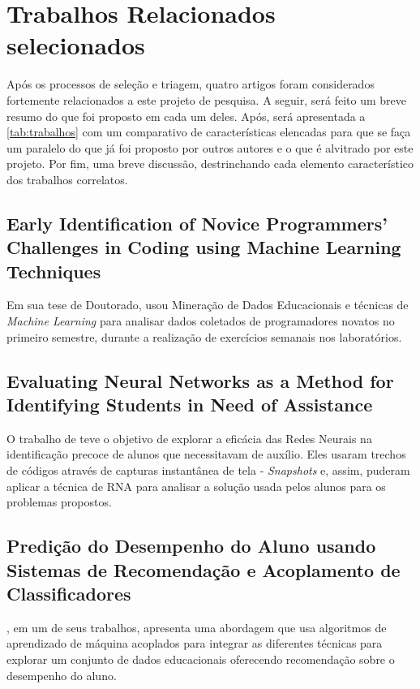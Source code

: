 \documentclass[
	12pt,				%
	openright,			%
	oneside,
	a4paper,			%
	english,			%
	french,				%
	spanish,			%
	brazil,				%
	]{abntex2}
\begin{document}
\section{Trabalhos Relacionados selecionados}
Após os processos de seleção e triagem, quatro artigos foram considerados fortemente relacionados a este projeto de pesquisa. A seguir, será feito um breve resumo do que foi proposto em cada um deles. Após, será apresentada a \autoref{tab:trabalhos} com um comparativo de características elencadas para que se faça um paralelo do que já foi proposto por outros autores e o que é alvitrado por este projeto. Por fim, uma breve discussão, destrinchando cada elemento característico dos trabalhos correlatos.

\subsection{Early Identification of Novice Programmers' Challenges in Coding using Machine Learning Techniques}
\label{sec:Early}
Em sua tese de Doutorado,  usou Mineração de Dados Educacionais e técnicas de \textit{Machine Learning} para analisar dados coletados de programadores novatos no primeiro semestre, durante a realização de exercícios semanais nos laboratórios.

\subsection{Evaluating Neural Networks as a Method for Identifying Students in Need of Assistance}
\label{sec:Evaluating}
O trabalho de  teve o objetivo de explorar a eficácia das Redes Neurais na identificação precoce de alunos que necessitavam de auxílio. Eles usaram trechos de códigos através de capturas instantânea de tela - \textit{Snapshots} e, assim, puderam aplicar a técnica de RNA para analisar a solução usada pelos alunos para os problemas propostos.

\subsection{Predição do Desempenho do Aluno usando Sistemas de Recomendação e Acoplamento de Classificadores}
\label{sec:Pred1}
, em um de seus trabalhos, apresenta uma abordagem que usa algoritmos de aprendizado de máquina acoplados para integrar as diferentes técnicas para explorar um conjunto de dados educacionais oferecendo recomendação sobre o desempenho do aluno.
\end{document}
